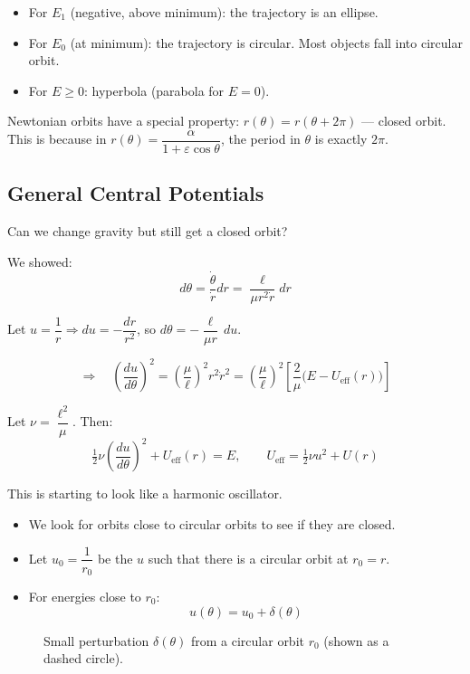 \begin{itemize}
    \item For $E_1$ (negative, above minimum): the trajectory is an ellipse.
    \item For $E_0$ (at minimum): the trajectory is circular. Most objects fall into circular orbit.
    \item For $E \geq 0$: hyperbola (parabola for $E = 0$).
\end{itemize}

Newtonian orbits have a special property: $r(\theta) = r(\theta + 2\pi)$ --- closed orbit. This is because in $r(\theta) = \dfrac{\alpha}{1+\varepsilon\cos\theta}$, the period in $\theta$ is exactly $2\pi$.

\subsection{General Central Potentials}

Can we change gravity but still get a closed orbit?

We showed:
\[
    d\theta = \frac{\dot\theta}{\dot r}dr = \frac{\ell}{\mu r^2 \dot r}dr
\]

Let $u = \dfrac{1}{r} \Rightarrow du = -\dfrac{dr}{r^2}$, so $d\theta = -\dfrac{\ell}{\mu r}\,du$.

\[
    \Rightarrow\quad \left(\frac{du}{d\theta}\right)^2
    = \left(\frac{\mu}{\ell}\right)^2 r^2 \dot r^2
    = \left(\frac{\mu}{\ell}\right)^2\left[\frac{2}{\mu}\bigl(E - U_\text{eff}(r)\bigr)\right]
\]

Let $\nu = \dfrac{\ell^2}{\mu}$. Then:
\[
    \tfrac{1}{2}\nu\left(\frac{du}{d\theta}\right)^2 + U_\text{eff}(r) = E,
    \qquad U_\text{eff} = \tfrac{1}{2}\nu u^2 + U(r)
\]

This is starting to look like a harmonic oscillator.

\begin{itemize}
    \item We look for orbits close to circular orbits to see if they are closed.
    \item Let $u_0 = \dfrac{1}{r_0}$ be the $u$ such that there is a circular orbit at $r_0 = r$.
    \item For energies close to $r_0$:
    \[
        u(\theta) = u_0 + \delta(\theta)
    \]
\end{itemize}

\begin{figure}[H]
\centering
\caption{Small perturbation $\delta(\theta)$ from a circular orbit $r_0$ (shown as a dashed circle).}
\end{figure}

